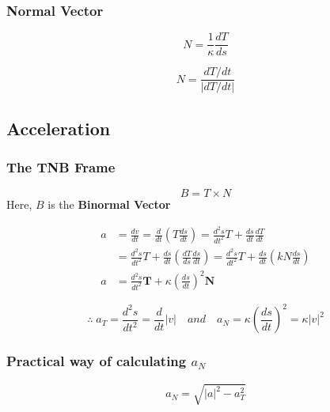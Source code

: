 \documentclass[12pt]{article}
\theoremstyle{definition}
\begin{document}
\subsubsection{Normal Vector}

\begin{equation*}
	N = \frac{1}{\kappa} \frac{dT}{ds}
\end{equation*}

\begin{equation*}
	N = \frac{dT/dt}{ \left| dT/dt \right| }
\end{equation*}

\subsection{Acceleration}

\subsubsection{The TNB Frame}

\begin{equation*}
	B = T \times N
\end{equation*}
Here, $B$ is the \textbf{Binormal Vector} 

\begin{align*}
	a &= \frac{dv}{dt} = \frac{d}{dt} \left( T \frac{ds}{dt} \right) = \frac{d^2s}{dt^2}T + \frac{ds}{dt}\frac{dT}{dt}\\
	&=  \frac{d^2s}{dt^2}T + \frac{ds}{dt} \left( \frac{dT}{ds} \frac{ds}{dt} \right) = \frac{d^2s}{dt^2}T + \frac{ds}{dt} \left( kN\frac{ds}{dt} \right) \\
	a	&=  \frac{d^2s}{dt^2} \textbf{T}  + \kappa \left( \frac{ds}{dt} \right)^2 \textbf{N} 
\end{align*}

\begin{equation*}
	\therefore\; a_T = \frac{d^2s}{dt^2} = \frac{d}{dt} \left| v \right|\quad and \quad a_N = \kappa \left( \frac{ds}{dt} \right) ^2 = \kappa \left| v \right| ^2
\end{equation*}

\subsubsection{Practical way of calculating $a_N$}

\begin{equation*}
	a_N = \sqrt{ \left| a \right|^2 - a_T^2 }
\end{equation*}
\end{document}

